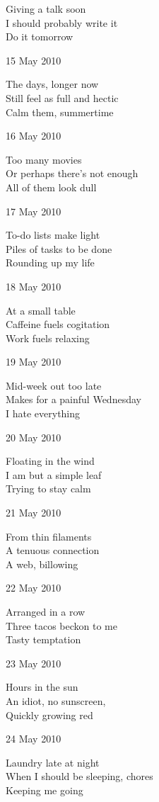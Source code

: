 \documentclass[12pt]{article}
\begin{document}
Giving a talk soon \\
I should probably write it \\
Do it tomorrow

15 May 2010

The days, longer now \\
Still feel as full and hectic \\
Calm them, summertime

16 May 2010

Too many movies \\
Or perhaps there's not enough \\
All of them look dull

17 May 2010

To-do lists make light \\
Piles of tasks to be done \\
Rounding up my life


\newpage

18 May 2010

At a small table \\
Caffeine fuels cogitation \\
Work fuels relaxing

19 May 2010

Mid-week out too late \\
Makes for a painful Wednesday \\
I hate everything

20 May 2010

Floating in the wind \\
I am but a simple leaf \\
Trying to stay calm

21 May 2010

From thin filaments \\
A tenuous connection \\
A web, billowing

22 May 2010

Arranged in a row \\
Three tacos beckon to me \\
Tasty temptation

23 May 2010

Hours in the sun \\
An idiot, no sunscreen, \\
Quickly growing red

24 May 2010 

Laundry late at night \\
When I should be sleeping, chores \\
Keeping me going
\end{document}
